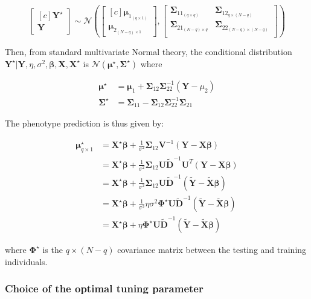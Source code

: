 \documentclass[12pt,letter]{article}\usepackage[]{graphicx}\usepackage[]{color}
\newcommand{\bX}{\textbf{X}}
\newcommand{\bY}{\textbf{Y}}
\newcommand{\bD}{\textbf{D}}
\newcommand{\bXtilde}{\widetilde{\bX}}
\newcommand{\bYtilde}{\widetilde{\bY}}
\newcommand{\bDtilde}{\widetilde{\bD}}
\newcommand{\bU}{\textbf{U}}
\newcommand{\bV}{\textbf{V}}
\newcommand{\bSigma}{\boldsymbol{\Sigma}}
\newcommand{\bmu}{\boldsymbol{\mu}}
\newcommand{\bbeta}{\boldsymbol{\beta}}
\newcommand{\bPhi}{\boldsymbol{\Phi}}
\begin{document}
\begin{equation}
\left[ \begin{matrix*}[c]
\bY^\star \\
\bY
\end{matrix*}\right] \sim \mathcal{N} \left( \left[\begin{matrix*}[c]
\bmu_{1_{(q\times 1)}} \\
\bmu_{2_{(N-q)\times 1}}
\end{matrix*}\right], \left[ \begin{matrix}
\bSigma_{11_{(q\times q)}} & \bSigma_{12_{q\times (N-q)}} \\
\bSigma_{21_{(N-q)\times q}} & \bSigma_{22_{(N-q)\times (N-q)}}  \\
\end{matrix}   \right]  \right)
\end{equation}


Then, from standard multivariate Normal theory, the conditional distribution $\bY^\star | \bY, \eta, \sigma^2, \bbeta,\bX, \bX^\star$ is $\mathcal{N}(\bmu^\star, \bSigma^\star)$ where

\begin{align}
\bmu^\star &= \bmu_1 + \bSigma_{12} \bSigma_{22}^{-1} (\bY - \mu_2) \\
\bSigma^\star & = \bSigma_{11} - \bSigma_{12} \bSigma_{22}^{-1} \bSigma_{21}
\end{align}

The phenotype prediction is thus given by:

\begin{align}
\bmu^\star_{q \times 1} & = \bX^\star \bbeta + \frac{1}{\sigma^2} \bSigma_{12} \bV^{-1} (\bY - \bX \bbeta)\\
& = \bX^\star \bbeta + \frac{1}{\sigma^2} \bSigma_{12} \bU \bDtilde^{-1} \bU^T (\bY - \bX \bbeta)\\
& = \bX^\star \bbeta + \frac{1}{\sigma^2} \bSigma_{12} \bU \bDtilde^{-1} (\bYtilde - \bXtilde \bbeta ) \\
& = \bX^\star \bbeta + \frac{1}{\sigma^2} \eta \sigma^2 \bPhi^\star \bU \bDtilde^{-1} (\bYtilde - \bXtilde \bbeta ) \\
& = \bX^\star \bbeta +  \eta  \bPhi^\star \bU \bDtilde^{-1} (\bYtilde - \bXtilde \bbeta )
\end{align}

where $\bPhi^\star$ is the $q \times (N-q)$ covariance matrix between the testing and training individuals.



\subsubsection{Choice of the optimal tuning parameter}
\end{document}
